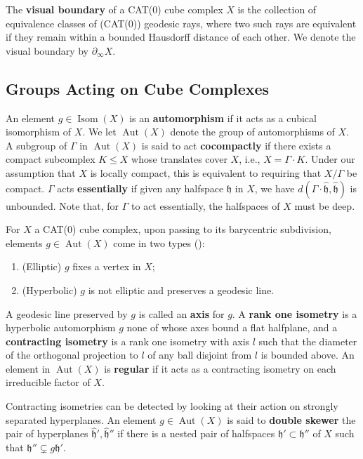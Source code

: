 \documentclass{amsart}
\theoremstyle{definition}
\newtheorem*{Notation warning}{Warning on notations}
\newtheorem*{Sketch of proof}{Sketch of proof for Theorem C}
\newcommand{\h}{{\mathfrak h}}
\newcommand{\hh}{\hat{\mathfrak h}}
\DeclareMathOperator{\Isom}{Isom}
\def\aut{\mathop{\mathrm{Aut}}\nolimits}
\begin{document}
\begin{sloppypar}
The {\bf visual boundary} of a CAT(0) cube complex $X$ is the collection of equivalence classes of (CAT(0)) geodesic rays, where two such rays are equivalent if they remain within a bounded Hausdorff distance of each other. We denote the visual boundary by $\partial_\infty X$. 

\subsection{Groups Acting on Cube Complexes} 

An element $g\in \Isom(X)$ is an {\bf automorphism} if it acts as a cubical isomorphism of $X$. We let $\aut(X)$ denote the group of automorphisms of $X$. 
A subgroup of $\Gamma$ in $\aut(X)$ is said to act {\bf cocompactly} if there exists a compact subcomplex $K\le X$ whose translates cover $X$, i.e., $X=\Gamma\cdot K$. Under our assumption that $X$ is locally compact, this is equivalent to requiring that $X/\Gamma$ be compact. $\Gamma$ acts {\bf essentially} if given any halfspace $\h$ in $X$, we have $d(\Gamma\cdot\hh,\hh)$ is unbounded.
Note that, for $\Gamma$ to act essentially, the halfspaces of $X$ must be deep.

\medskip

For $X$ a CAT(0) cube complex, upon passing to its barycentric subdivision, elements $g\in \aut(X)$ come in two types (\cite{Haglund2007IsometriesOC}):
\begin{enumerate}
    \item (Elliptic) $g$ fixes a vertex in $X$;
    
    \item (Hyperbolic) $g$ is not elliptic and preserves a geodesic line.
\end{enumerate}
\medskip

\noindent A geodesic line preserved by $g$ is called an {\bf axis} for $g$. A {\bf rank one isometry} is a hyperbolic automorphism $g$ none of whose axes bound a flat halfplane, and a {\bf contracting isometry} is a rank one isometry with axis $l$ such that the diameter of the orthogonal projection to $l$ of any ball disjoint from $l$ is bounded above. 
An element in $\aut(X)$ is \textbf{regular} if it acts as a contracting isometry on each irreducible factor of $X$.
\medskip
 
Contracting isometries can be detected by looking at their action on strongly separated hyperplanes. An element $g\in \aut(X)$ is said to \textbf{double skewer} the pair of hyperplanes $\hh',\hh''$ if there is a nested pair of halfspaces $\h'\subset\h''$ of $X$ such that $\h''\subsetneq g\h'$.


\end{sloppypar}
\end{document}

